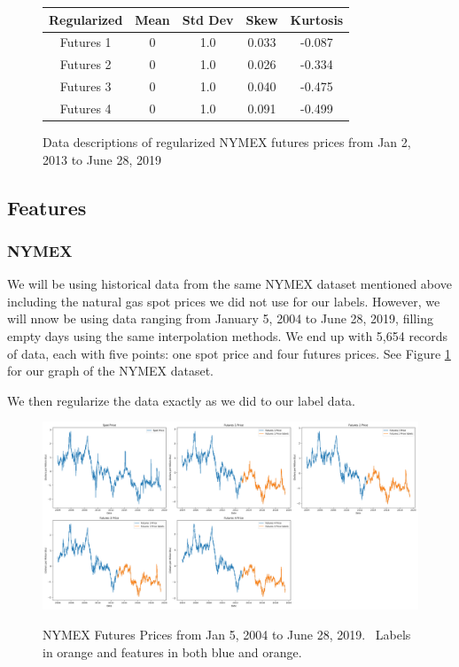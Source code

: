 \documentclass[final]{cvpr}
\begin{document}
    \begin{figure}[h]
        \caption{Data descriptions of regularized NYMEX futures prices from Jan 
            2, 2013 to June 28, 2019}
        \center
        \begin{tabular}{| c || c | c | c | c |}
            \hline 
            Regularized & Mean & Std Dev & Skew & Kurtosis\\ 
            \hline
            \hline
            Futures 1 & 0 & 1.0 & 0.033 & -0.087\\
            Futures 2 & 0 & 1.0 & 0.026 & -0.334\\
            Futures 3 & 0 & 1.0 & 0.040 & -0.475\\
            Futures 4 & 0 & 1.0 & 0.091 & -0.499\\
            \hline
        \end{tabular}
    \end{figure}

\subsection{Features}

\subsubsection{NYMEX}

    We will be using historical data from the same NYMEX dataset mentioned above
    including the natural gas spot prices we did not use for our labels. 
    However, we will nnow be using data ranging from January 5, 2004 to June 28,
    2019, filling empty days using the same interpolation methods. We end up 
    with 5,654 records of data, each with five points: one spot price and four 
    futures prices. See Figure \ref{fig:nymex_graph} for our graph of the NYMEX 
    dataset.

    We then regularize the data exactly as we did to our label data.
    
    \begin{figure}[h]
        \caption{NYMEX Futures Prices from Jan 5, 2004 to June 28, 2019. \
            Labels in orange and features in both blue and orange.} 
        \center
        \includegraphics[width=1.0\textwidth]{images/nymex_data.png}
        \label{fig:nymex_graph}
    \end{figure}
    
\end{document}
